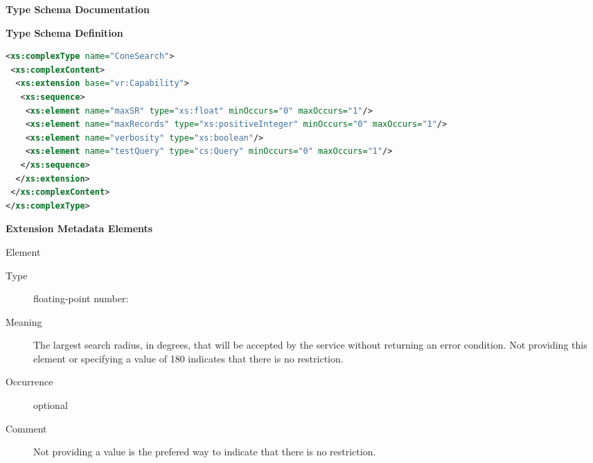 \documentclass[11pt,a4paper]{ivoa}
\begin{document}
\begin{generated}
\begingroup
	\renewcommand*\descriptionlabel[1]{%
	\hbox to 5.5em{\emph{#1}\hfil}}\vspace{2ex}\noindent\textbf{ Type Schema Documentation}


\vspace{1ex}\noindent\textbf{ Type Schema Definition}

\begin{lstlisting}[language=XML,basicstyle=\footnotesize]
<xs:complexType name="ConeSearch">
 <xs:complexContent>
  <xs:extension base="vr:Capability">
   <xs:sequence>
    <xs:element name="maxSR" type="xs:float" minOccurs="0" maxOccurs="1"/> 
    <xs:element name="maxRecords" type="xs:positiveInteger" minOccurs="0" maxOccurs="1"/>
    <xs:element name="verbosity" type="xs:boolean"/>
    <xs:element name="testQuery" type="cs:Query" minOccurs="0" maxOccurs="1"/>
   </xs:sequence>
  </xs:extension>
 </xs:complexContent>
</xs:complexType>
\end{lstlisting}

\vspace{0.5ex}\noindent\textbf{ Extension Metadata Elements}

\begingroup
\small
\begin{bigdescription}

	\item[Element \xmlel{maxSR}]
	\begin{description}
		\item[Type] floating-point number: 
		\item[Meaning] The largest search radius, in degrees, that will be
accepted by the service without returning an error condition.  Not
providing this element or specifying a value of 180 indicates that there
is no restriction.                 
		\item[Occurrence] optional \item[Comment] Not providing a value is the
prefered way to indicate that there is no restriction. 
	\end{description} 


\end{bigdescription}
\end{generated}
\end{document}
